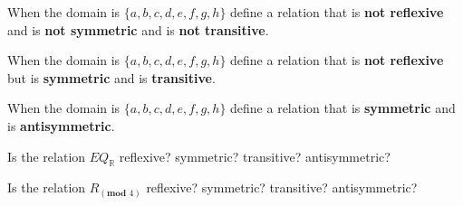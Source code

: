 

When the domain is $\{ a,b,c,d,e,f,g,h\}$ define a relation that is {\bf not reflexive} and 
is {\bf not symmetric} and is {\bf not transitive}.

\vfill

When the domain is $\{ a,b,c,d,e,f,g,h\}$ define a relation that is {\bf not reflexive} but 
is {\bf symmetric} and is {\bf transitive}.

\vfill

When the domain is $\{ a,b,c,d,e,f,g,h\}$ define a relation that is {\bf symmetric} and
is {\bf antisymmetric}.

\vfill

Is the relation $EQ_{\mathbb{R}}$ reflexive? symmetric? transitive? antisymmetric?

\vfill

Is the relation $R_{(\textbf{mod } 4)}$ reflexive? symmetric? transitive? antisymmetric?

\vfill
%
%
